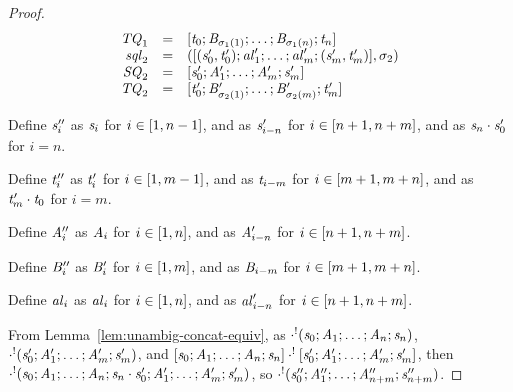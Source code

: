 \documentclass[numbers,10pt,preprint\ifanon ,nocopyrightspace\fi]{sigplanconf}
\begin{document}
\begin{proof}
\[\begin{array}{rcl}
      \mathit{TQ}_1 & = &
                           [\mathit{t}_0;\mathit{B}_{\sigma_1(1)};\ldots;\mathit{B}_{\sigma_1(n)};\mathit{t}_n]\\
      \mathit{sql}_2 & = &
                            ([(\mathit{s}_0',\mathit{t}_0');\mathit{al}_1';\ldots;\mathit{al}_m';(\mathit{s}_m',\mathit{t}_m')],\sigma_2)\\
      \mathit{SQ}_2 & = &
                        [\mathit{s}_0';\mathit{A}_1';\ldots;\mathit{A}_m';\mathit{s}_m']\\
      \mathit{TQ}_2 & = &
                           [\mathit{t}_0';\mathit{B}_{\sigma_2(1)}';\ldots;\mathit{B}_{\sigma_2(m)}';\mathit{t}_m']
    \end{array}
  \]

  Define $\mathit{s}_i''$ as $\mathit{s}_i$ for $i \in [1,n-1]$, and as
  $\mathit{s}_{i-n}'$ for $i \in [n+1,n+m]$, and as
  $\mathit{s}_n\cdot\mathit{s}_0'$ for $i=n$.

  Define $\mathit{t}_i''$ as $\mathit{t}_i'$ for $i \in [1,m-1]$,
  and as $\mathit{t}_{i-m}$ for $i \in
  [m+1,m+n]$, and as $\mathit{t}_m'\cdot\mathit{t}_0$ for $i=m$.

  Define $\mathit{A}_i''$ as $\mathit{A}_i$ for $i \in [1,n]$, and as
  $\mathit{A}_{i-n}'$ for $i \in [n+1,n+m]$.

  Define $\mathit{B}_i''$ as $\mathit{B}_i'$ for $i \in [1,m]$, and as
  $\mathit{B}_{i-m}$ for $i \in [m+1,m+n]$.

  Define $\mathit{al}_i$ as $\mathit{al}_i$ for $i \in [1,n]$, and as
  $\mathit{al}_{i-n}'$ for $i \in [n+1,n+m]$.

  From Lemma~\ref{lem:unambig-concat-equiv}, as
  $\cdot^!(\mathit{s}_0;\mathit{A}_1;\ldots;\mathit{A}_n;\mathit{s}_n)$,
  $\cdot^!(\mathit{s}_0';\mathit{A}_1';\ldots;\mathit{A}_m';\mathit{s}_m')$,
  and
  $[\mathit{s}_0;\mathit{A}_1;\ldots;\mathit{A}_n;\mathit{s}_n] \cdot^! [\mathit{s}_0';\mathit{A}_1';\ldots;\mathit{A}_m';\mathit{s}_m']$,
  then $\cdot^!(\mathit{s}_0;\mathit{A}_1;\ldots;\mathit{A}_n;
    \mathit{s}_n\cdot\mathit{s}_0';
    \mathit{A}_1';\ldots;\mathit{A}_m';\mathit{s}_m')$, so
  $\cdot^!(\mathit{s}_0'';\mathit{A}_1'';\ldots;\mathit{A}_{n+m}'';\mathit{s}_{n+m}'')$.


\end{proof}
\end{document}
